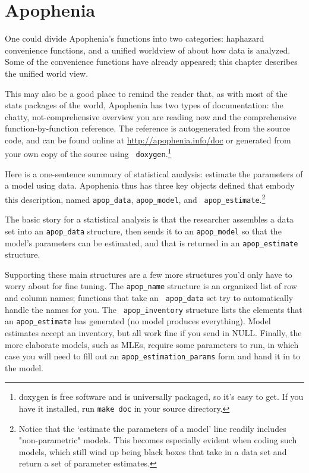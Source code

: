 \chapter{Apophenia} \label{apop}

One could divide Apophenia's functions into two categories: haphazard
convenience functions, and a unified worldview of about how data is
analyzed. Some of the convenience functions have already appeared; this
chapter describes the unified world view. 

This may also be a good place to remind the reader that, as with most of
the stats packages of the world, Apophenia has two types of
documentation: the chatty, not-comprehensive overview you are reading now and the
comprehensive function-by-function reference. The reference is autogenerated from the
source code, and can be found online at \url{http://apophenia.info/doc}
or generated from your own copy of the source using {\tt
doxygen}.\footnote{doxygen is free software and is universally packaged,
so it's easy to get. If you have it installed, run {\tt make doc} in
your source directory.}

Here is a one-sentence summary of statistical analysis: estimate the
parameters of a model
using data. Apophenia thus has three key objects defined that embody
this description, named {\tt apop\_data}, {\tt apop\_model}, and {\tt
apop\_estimate}.\footnote{Notice that the `estimate the parameters of a
model' line readily includes "non-parametric" models. This becomes
especially evident when coding such models, which still wind up being
black boxes that take in a data set and return a set of parameter
estimates.}

The basic story for a statistical analysis is that the researcher
assembles a data set into an {\tt apop\_data} structure, then sends it to
an {\tt apop\_model} so that the model's parameters can be estimated,
and that is returned in an {\tt apop\_estimate} structure.

Supporting these main structures are a few more structures you'd only
have to worry about for fine tuning.  The {\tt apop\_name} structure is
an organized list of row and column names; functions that take an {\tt
apop\_data} set try to automatically handle the names for you.  The {\tt
apop\_inventory} structure lists the elements that an {\tt apop\_estimate}
has generated (no model produces everything). Model estimates accept
an inventory, but all work fine if you send in NULL. Finally, the more
elaborate models, such as MLEs, require some parameters to run, in
which case you will need to fill out an {\tt apop\_estimation\_params}
form and hand it in to the model.


